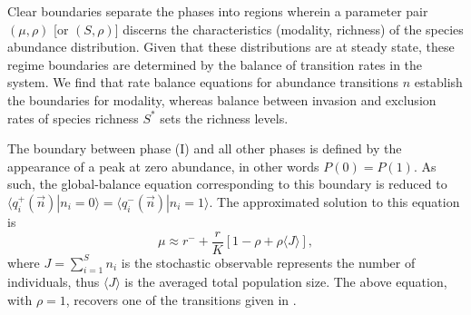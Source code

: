 \documentclass[9pt,lineno]{elife}
\begin{document}
 
Clear boundaries separate the phases into regions wherein a parameter pair $(\mu,\rho)$ [or $(S,\rho)$] discerns the characteristics (modality, richness) of the species abundance distribution.
Given that these distributions are at steady state, these regime boundaries are determined by the balance of transition rates in the system.
We find that rate balance equations for abundance transitions $n$ establish the boundaries for modality, whereas balance between invasion and exclusion rates of species richness $S^*$ sets the richness levels.

\iffalse
\begin{center}
\begin{tabular}{lccc}
\hline
\multirow{2}{4em}{\textcolor{black}{modality:}} & &
      \textcolor{black}{$R_n(n^* \rightarrow n^* +1)=R_n(n^*+1 \rightarrow n^*)$} \\ &
     & \textcolor{black}{$R_n(0 \rightarrow 1)=R_n(1 \rightarrow 0)$}   \\
    \hline 
    \multirow{2}{4em}{\textcolor{black}{richness:}}  & & \textcolor{black}{$R_{S^*}(1 \rightarrow 2)=R_{S^*}(2 \rightarrow 1)$} \\ &
     & \textcolor{black}{$R_{S^*}(S \rightarrow S-1)=R_{S^*}(S-1 \rightarrow S)$}
\\
\hline
\end{tabular}    
\end{center}

\fi

The boundary between phase (I)  and all other phases is defined by the appearance of a peak at zero abundance, in other words $P(0)=P(1)$.
As such, the global-balance equation corresponding to this boundary is reduced to
$\langle q_i^+(\vec{n})|n_i=0 \rangle=\langle q_i^-(\vec{n})|n_i=1 \rangle$.
The approximated solution to this equation is
\begin{equation}
    \mu \approx r^- +\frac{r}{K}[1-\rho+\rho \langle J\rangle ],
\end{equation}
where $J=\sum_{i=1}^S n_i$ is the stochastic observable represents the number of individuals, thus $\langle J \rangle$ is the averaged total population size.  The above equation, with $\rho=1$, recovers one of the transitions given in  \cite{xu2018immigration}.
\end{document}
